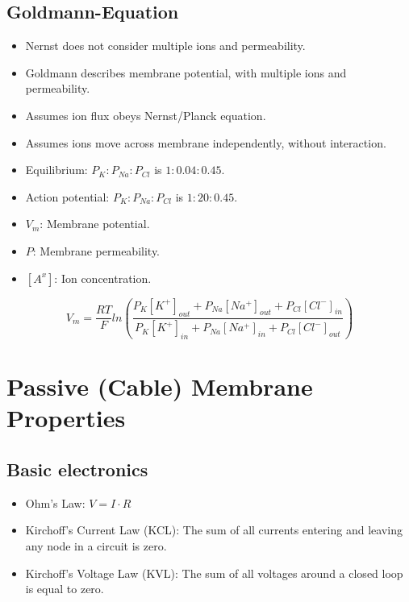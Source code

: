 \documentclass[a4paper, 12pt]{article}
\begin{document}
\subsection{Goldmann-Equation}
\begin{itemize}[noitemsep,nolistsep]
	\item Nernst does not consider multiple ions and permeability.
	\item Goldmann describes membrane potential, with multiple ions and permeability.
	\item Assumes ion flux obeys Nernst/Planck equation.
	\item Assumes ions move across membrane independently, without interaction.
	\item Equilibrium: $P_K:P_{Na}:P_{Cl}$ is $1:0.04:0.45$.
	\item Action potential: $P_K:P_{Na}:P_{Cl}$ is $1:20:0.45$.
	\item $V_m$: Membrane potential.
	\item $P$: Membrane permeability.
	\item $[A^x]$: Ion concentration.
\end{itemize}

\[V_m = \frac{RT}{F} ln(\frac{P_K[K^+]_{out} + P_{Na}[Na^+]_{out} + P_{Cl}[Cl^{-}]_{in}}{P_K[K^+]_{in} + P_{Na}[Na^+]_{in} + P_{Cl}[Cl^{-}]_{out}})\]

\section{Passive (Cable) Membrane Properties}
\subsection{Basic electronics}
\begin{itemize}[noitemsep,nolistsep]
	\item Ohm's Law: $V = I \cdot R$
	\item Kirchoff's Current Law (KCL): The sum of all currents entering and leaving any node in a circuit is zero.
	\item Kirchoff's Voltage Law (KVL): The sum of all voltages around a closed loop is equal to zero.
\end{itemize}
\end{document}
